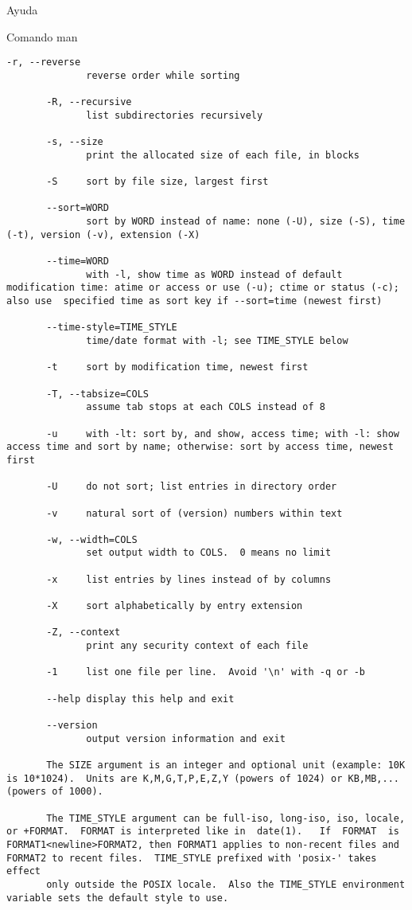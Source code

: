\begin{section}{Ayuda}
\begin{subsection}{Comando man}
\begin{lstlisting}[style=Ubuntu]
       -r, --reverse
              reverse order while sorting

       -R, --recursive
              list subdirectories recursively

       -s, --size
              print the allocated size of each file, in blocks

       -S     sort by file size, largest first

       --sort=WORD
              sort by WORD instead of name: none (-U), size (-S), time (-t), version (-v), extension (-X)

       --time=WORD
              with -l, show time as WORD instead of default modification time: atime or access or use (-u); ctime or status (-c); also use  specified time as sort key if --sort=time (newest first)

       --time-style=TIME_STYLE
              time/date format with -l; see TIME_STYLE below

       -t     sort by modification time, newest first

       -T, --tabsize=COLS
              assume tab stops at each COLS instead of 8

       -u     with -lt: sort by, and show, access time; with -l: show access time and sort by name; otherwise: sort by access time, newest first

       -U     do not sort; list entries in directory order

       -v     natural sort of (version) numbers within text

       -w, --width=COLS
              set output width to COLS.  0 means no limit

       -x     list entries by lines instead of by columns

       -X     sort alphabetically by entry extension

       -Z, --context
              print any security context of each file

       -1     list one file per line.  Avoid '\n' with -q or -b

       --help display this help and exit

       --version
              output version information and exit

       The SIZE argument is an integer and optional unit (example: 10K is 10*1024).  Units are K,M,G,T,P,E,Z,Y (powers of 1024) or KB,MB,... (powers of 1000).

       The TIME_STYLE argument can be full-iso, long-iso, iso, locale, or +FORMAT.  FORMAT is interpreted like in  date(1).   If  FORMAT  is  FORMAT1<newline>FORMAT2, then FORMAT1 applies to non-recent files and FORMAT2 to recent files.  TIME_STYLE prefixed with 'posix-' takes effect
       only outside the POSIX locale.  Also the TIME_STYLE environment variable sets the default style to use.


\end{lstlisting}
\end{subsection}
\end{section}
